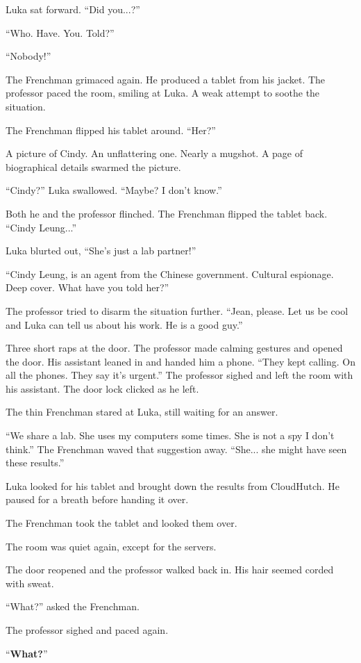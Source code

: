 \documentclass[ebook,11pt,oneside,openany]{memoir}
\begin{document}
Luka sat forward. ``Did you...?''

``Who. Have. You. Told?''

``Nobody!''

The Frenchman grimaced again. He produced a tablet from his jacket. The professor paced the room, smiling at Luka. A weak attempt to soothe the situation.

The Frenchman flipped his tablet around. ``Her?''

A picture of Cindy. An unflattering one. Nearly a mugshot. A page of biographical details swarmed the picture.

``Cindy?'' Luka swallowed. ``Maybe? I don't know.''

Both he and the professor flinched. The Frenchman flipped the tablet back. ``Cindy Leung...''

Luka blurted out, ``She's just a lab partner!''

``Cindy Leung, is an agent from the Chinese government. Cultural espionage. Deep cover. What have you told her?''

The professor tried to disarm the situation further. ``Jean, please. Let us be cool and Luka can tell us about his work. He is a good guy.''

Three short raps at the door. The professor made calming gestures and opened the door. His assistant leaned in and handed him a phone. ``They kept calling. On all the phones. They say it's urgent.'' The professor sighed and left the room with his assistant. The door lock clicked as he left.

The thin Frenchman stared at Luka, still waiting for an answer.

``We share a lab. She uses my computers some times. She is not a spy I don't think.'' The Frenchman waved that suggestion away. ``She... she might have seen these results.''

Luka looked for his tablet and brought down the results from CloudHutch. He paused for a breath before handing it over.

The Frenchman took the tablet and looked them over.

The room was quiet again, except for the servers.

The door reopened and the professor walked back in. His hair seemed corded with sweat.

``What?'' asked the Frenchman.

The professor sighed and paced again.

``\textbf{What?}''
\end{document}
